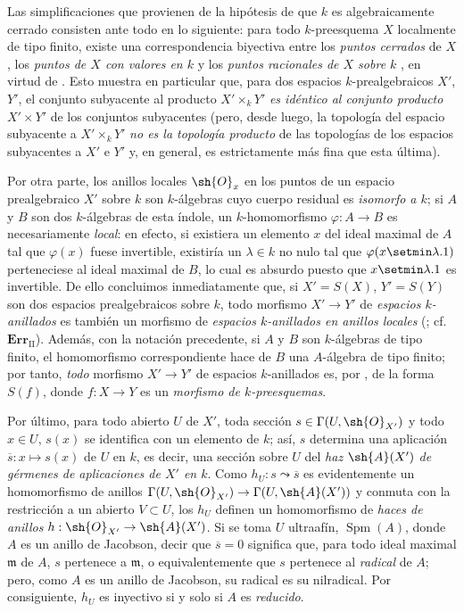 \begin{env}[10.10.3]
\label{IV.10.10.3}
Las simplificaciones que provienen de la hipótesis de que $k$ es algebraicamente cerrado consisten ante todo en lo siguiente: para todo $k$-preesquema $X$ localmente de tipo finito, existe una correspondencia biyectiva entre los \emph{puntos cerrados} de $X$, los \emph{puntos de $X$ con valores en $k$}  y los \emph{puntos racionales de $X$ sobre $k$} , en virtud de .
Esto muestra en particular  que, para dos espacios $k$-prealgebraicos $X'$, $Y'$, el conjunto subyacente al producto $X'\times_kY'$ \emph{es idéntico al conjunto producto} $X'\times Y'$ de los conjuntos subyacentes (pero, desde luego, la topología del espacio subyacente a $X'\times_kY'$ \emph{no es la topología producto} de las topologías de los espacios subyacentes a $X'$ e $Y'$ y, en general, es estrictamente más fina que esta última).

Por otra parte, los anillos locales $\sh{O}_x$ en los puntos de un espacio prealgebraico $X'$ sobre $k$ son $k$-álgebras cuyo cuerpo residual es \emph{isomorfo a $k$}; si $A$ y $B$ son dos $k$-álgebras de esta índole, un $k$-homomorfismo $\varphi:A\to B$ es necesariamente \emph{local}: en efecto, si existiera un elemento $x$ del ideal maximal de $A$ tal que $\varphi(x)$ fuese invertible, existiría un $\lambda\in k$ no nulo tal que $\varphi(x\setmin\lambda.1)$ perteneciese al ideal maximal de $B$, lo cual es absurdo puesto que $x\setmin\lambda.1$ es invertible.
De ello concluimos inmediatamente que, si $X'=S(X)$, $Y'=S(Y)$ son dos espacios prealgebraicos sobre $k$, todo morfismo $X'\to Y'$ de \emph{espacios $k$-anillados} es también un morfismo de \emph{espacios $k$-anillados en anillos locales} (; cf.\ $\mathbf{Err}_{\mathrm{II}}$). Además, con la notación precedente, si $A$ y $B$ son $k$-álgebras de tipo finito, el homomorfismo correspondiente hace de $B$ una $A$-álgebra de tipo finito; por tanto, \emph{todo} morfismo $X'\to Y'$ de espacios $k$-anillados es, por , de la forma $S(f)$, donde $f:X\to Y$ es un \emph{morfismo de $k$-preesquemas}.

Por último, para todo abierto $U$ de $X'$, toda sección $s\in\Gamma(U,\sh{O}_{X'})$ y todo $x\in U$, $s(x)$  se identifica con un elemento de $k$; así, $s$ determina una aplicación $\overline{s}:x\mapsto s(x)$ de $U$ en $k$, es decir, una sección sobre $U$ del \emph{haz $\sh{A}(X')$ de gérmenes de aplicaciones de $X'$ en $k$}. Como $h_U:s\leadsto\overline{s}$ es evidentemente un homomorfismo de anillos $\Gamma(U,\sh{O}_{X'})\to\Gamma(U,\sh{A}(X'))$ y conmuta con la restricción a un abierto $V\subset U$, los $h_U$ definen un homomorfismo de \emph{haces de anillos} $h:\sh{O}_{X'}\to\sh{A}(X')$.
Si se toma $U$ ultraafín, $\operatorname{Spm}(A)$, donde $A$ es un anillo de Jacobson, decir que $\overline{s}=0$ significa que, para todo ideal maximal $\mathfrak{m}$ de $A$, $s$ pertenece a $\mathfrak{m}$, o equivalentemente que $s$ pertenece al \emph{radical} de $A$; pero, como $A$ es un anillo de Jacobson, su radical es su nilradical. Por consiguiente, $h_U$ es inyectivo si y solo si $A$ es \emph{reducido}.
\end{env}

